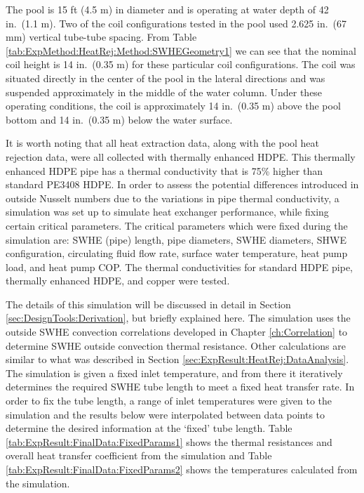 The pool is 15 ft (4.5 m) in diameter and is operating at water depth of 42 in.\ (1.1 m). Two of the coil configurations tested in the pool used 2.625 in.\ (67 mm) vertical tube-tube spacing. From Table \ref{tab:ExpMethod:HeatRej:Method:SWHEGeometry1} we can see that the nominal coil height is 14 in.\ (0.35 m) for these particular coil configurations. The coil was situated directly in the center of the pool in the lateral directions and was suspended approximately in the middle of the water column. Under these operating conditions, the coil is approximately 14 in.\ (0.35 m) above the pool bottom and 14 in.\ (0.35 m) below the water surface.

It is worth noting that all heat extraction data, along with the pool heat rejection data, were all collected with thermally enhanced HDPE. This thermally enhanced HDPE pipe has a thermal conductivity that is 75\% higher \citep{Gonthier2012} than standard PE3408 HDPE. In order to assess the potential differences introduced in outside Nusselt numbers due to the variations in pipe thermal conductivity, a simulation was set up to simulate heat exchanger performance, while fixing certain critical parameters.  The critical parameters which were fixed during the simulation are: SWHE (pipe) length, pipe diameters, SWHE diameters, SHWE configuration, circulating fluid flow rate, surface water temperature, heat pump load, and heat pump COP. The thermal conductivities for standard HDPE pipe, thermally enhanced HDPE, and copper were tested. 

The details of this simulation will be discussed in detail in Section \ref{sec:DesignTools:Derivation}, but briefly explained here. The simulation uses the outside SWHE convection correlations developed in Chapter \ref{ch:Correlation} to determine SWHE outside convection thermal resistance. Other calculations are similar to what was described in Section \ref{sec:ExpResult:HeatRej:DataAnalysis}.  The simulation is given a fixed inlet temperature, and from there it iteratively determines the required SWHE tube length to meet a fixed heat transfer rate. In order to fix the tube length, a range of inlet temperatures were given to the simulation and the results below were interpolated between data points to determine the desired information at the `fixed' tube length. Table \ref{tab:ExpResult:FinalData:FixedParams1} shows the thermal resistances and overall heat transfer coefficient from the simulation and Table \ref{tab:ExpResult:FinalData:FixedParams2} shows the temperatures calculated from the simulation.

